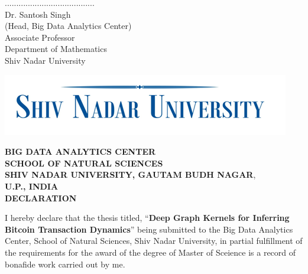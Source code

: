 \documentclass[12pt, oneside]{Thesis} %
\begin{document}
\hfill
\begin{minipage}{.45\linewidth}
\begin{flushright}                                      

.......................................\\
Dr. Santosh Singh\\
(Head, Big Data Analytics Center)\\
Associate Professor\\
Department of Mathematics\\
Shiv Nadar University
\end{flushright} 
\end{minipage}
\clearpage %


\pagestyle{fancy} %
\begin{center}
\begin{center}
\includegraphics[scale=0.8]{./snulogo.png}
\end{center}
\singlespacing
\singlespacing
\begin{center}
\textmd{\textbf{BIG DATA ANALYTICS CENTER}}\\
\singlespacing
\textbf{SCHOOL OF NATURAL SCIENCES}\\
\singlespacing
\textmd{\textbf{SHIV NADAR UNIVERSITY, GAUTAM BUDH NAGAR},}\\
\singlespacing
\textbf{U.P., INDIA}\\
\singlespacing
\singlespacing
\singlespacing
\singlespacing
\singlespacing
\textbf{DECLARATION\\}
\end{center}
\end{center}
I hereby declare that the thesis titled, ``\textbf{Deep Graph Kernels for Inferring Bitcoin Transaction Dynamics}” being submitted to the Big Data Analytics Center, School of Natural Sciences, Shiv Nadar University, in partial fulfillment of the requirements for the award of the degree of Master of Sceience is a record of bonafide work carried out by me.\\
\end{document}
